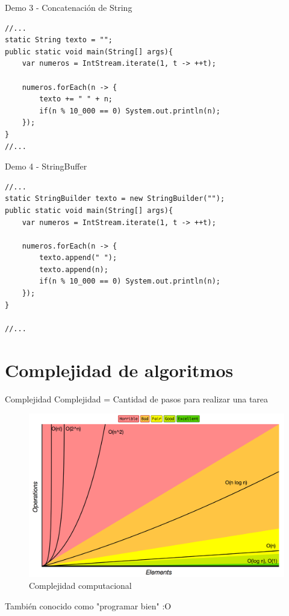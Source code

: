 \documentclass{beamer}
\begin{document}
\begin{frame}[fragile]{Demo 3 - Concatenación de String}
\begin{lstlisting}
//...
static String texto = "";
public static void main(String[] args){
	var numeros = IntStream.iterate(1, t -> ++t);
	
	numeros.forEach(n -> {
		texto += " " + n;
		if(n % 10_000 == 0) System.out.println(n);
	});
}
//...
\end{lstlisting}
\end{frame}

\begin{frame}[fragile]{Demo 4 - StringBuffer}
\begin{lstlisting}
//...
static StringBuilder texto = new StringBuilder("");
public static void main(String[] args){
	var numeros = IntStream.iterate(1, t -> ++t);
	
	numeros.forEach(n -> {
		texto.append(" ");
		texto.append(n);
		if(n % 10_000 == 0) System.out.println(n);
	});
}

//...
\end{lstlisting}
\end{frame}

\section{Complejidad de algoritmos}
\begin{frame}{Complejidad}
Complejidad = Cantidad de pasos para realizar una tarea\\
\begin{figure}
	\centering
	\includegraphics[width=0.7\linewidth]{Images/complex}
	\caption{Complejidad computacional}
	\label{fig:complex}
\end{figure}
También conocido como "programar bien" :O
\end{frame}
\end{document}

